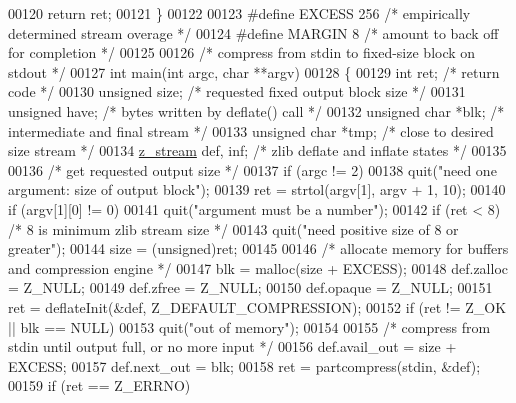 \begin{DoxyCode}
{00120     \textcolor{keywordflow}{return} ret;
00121 \}
00122 
00123 \textcolor{preprocessor}{#define EXCESS 256      }\textcolor{comment}{/* empirically determined stream overage */}\textcolor{preprocessor}{}
00124 \textcolor{preprocessor}{#define MARGIN 8        }\textcolor{comment}{/* amount to back off for completion */}\textcolor{preprocessor}{}
00125 
00126 \textcolor{comment}{/* compress from stdin to fixed-size block on stdout */}
00127 \textcolor{keywordtype}{int} main(\textcolor{keywordtype}{int} argc, \textcolor{keywordtype}{char} **argv)
00128 \{
00129     \textcolor{keywordtype}{int} ret;                \textcolor{comment}{/* return code */}
00130     \textcolor{keywordtype}{unsigned} size;          \textcolor{comment}{/* requested fixed output block size */}
00131     \textcolor{keywordtype}{unsigned} have;          \textcolor{comment}{/* bytes written by deflate() call */}
00132     \textcolor{keywordtype}{unsigned} \textcolor{keywordtype}{char} *blk;     \textcolor{comment}{/* intermediate and final stream */}
00133     \textcolor{keywordtype}{unsigned} \textcolor{keywordtype}{char} *tmp;     \textcolor{comment}{/* close to desired size stream */}
00134     \hyperlink{structz__stream__s}{z\_stream} def, inf;      \textcolor{comment}{/* zlib deflate and inflate states */}
00135 
00136     \textcolor{comment}{/* get requested output size */}
00137     \textcolor{keywordflow}{if} (argc != 2)
00138         quit(\textcolor{stringliteral}{"need one argument: size of output block"});
00139     ret = strtol(argv[1], argv + 1, 10);
00140     \textcolor{keywordflow}{if} (argv[1][0] != 0)
00141         quit(\textcolor{stringliteral}{"argument must be a number"});
00142     \textcolor{keywordflow}{if} (ret < 8)            \textcolor{comment}{/* 8 is minimum zlib stream size */}
00143         quit(\textcolor{stringliteral}{"need positive size of 8 or greater"});
00144     size = (unsigned)ret;
00145 
00146     \textcolor{comment}{/* allocate memory for buffers and compression engine */}
00147     blk = malloc(size + EXCESS);
00148     def.zalloc = Z\_NULL;
00149     def.zfree = Z\_NULL;
00150     def.opaque = Z\_NULL;
00151     ret = deflateInit(&def, Z\_DEFAULT\_COMPRESSION);
00152     \textcolor{keywordflow}{if} (ret != Z\_OK || blk == NULL)
00153         quit(\textcolor{stringliteral}{"out of memory"});
00154 
00155     \textcolor{comment}{/* compress from stdin until output full, or no more input */}
00156     def.avail\_out = size + EXCESS;
00157     def.next\_out = blk;
00158     ret = partcompress(stdin, &def);
00159     \textcolor{keywordflow}{if} (ret == Z\_ERRNO)
}
\end{DoxyCode}
